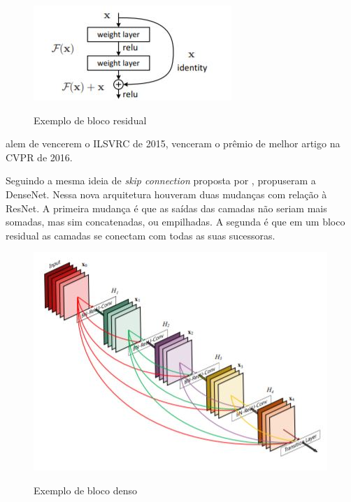 \begin{figure}[H]
	\setlength{\abovecaptionskip}{0pt}
	\setlength{\belowcaptionskip}{0pt}
	\caption[Exemplo de bloco residual]{Exemplo de bloco residual}
	\centering
	\includegraphics[width=.5\textwidth]{imagem/0x_resnet_arch.jpg}
	\captionsetup{justification=centering}
	\label{fig:blocoresidual}
\end{figure}

 alem de vencerem o \ac{ILSVRC} de 2015, venceram o prêmio de melhor artigo na \ac{CVPR} de 2016.

Seguindo a mesma ideia de \textit{skip connection} proposta por ,  propuseram a \ac{DenseNet}. Nessa nova arquitetura houveram duas mudanças com relação à \ac{ResNet}. A primeira mudança é que as saídas das camadas não seriam mais somadas, mas sim concatenadas, ou empilhadas. A segunda é que em um bloco residual as camadas se conectam com todas as suas sucessoras. 

\begin{figure}[H]
	\setlength{\abovecaptionskip}{0pt}
	\setlength{\belowcaptionskip}{0pt}
	\caption[Exemplo de bloco denso]{Exemplo de bloco denso}
	\centering
	\includegraphics[width=.5\textwidth]{imagem/0x_densenet_arch.jpg}
	\captionsetup{justification=centering}
	\label{fig:blocodenso}
\end{figure}

